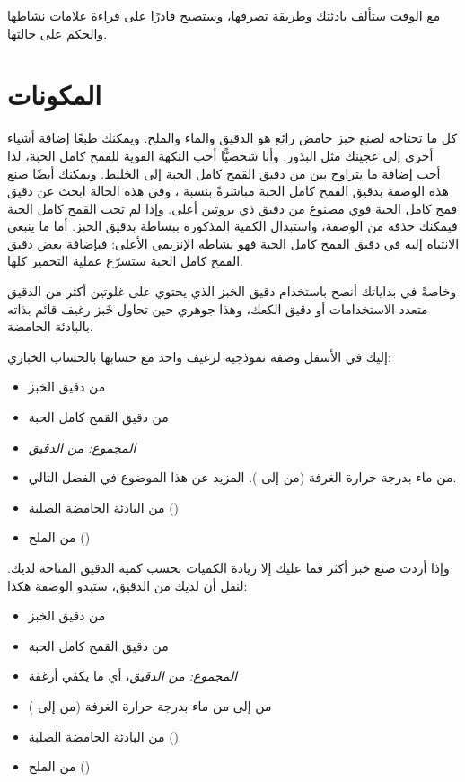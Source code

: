 مع الوقت ستألف بادئتك وطريقة تصرفها، وستصبح قادرًا على قراءة علامات نشاطها والحكم على حالتها.

\section{المكونات}

كل ما تحتاجه لصنع خبز حامض رائع هو الدقيق والماء والملح. ويمكنك طبعًا إضافة أشياء أخرى إلى عجينك مثل البذور. وأنا شخصيًّا أحب النكهة القوية للقمح كامل الحبة، لذا أحب إضافة ما يتراوح بين  من دقيق القمح كامل الحبة إلى الخليط. ويمكنك أيضًا صنع هذه الوصفة بدقيق القمح كامل الحبة مباشرةً بنسبة ، وفي هذه الحالة ابحث عن دقيق قمح كامل الحبة قوي مصنوع من دقيق ذي بروتين أعلى. وإذا لم تحب القمح كامل الحبة فيمكنك حذفه من الوصفة، واستبدال الكمية المذكورة ببساطة بدقيق الخبز. أما ما ينبغي الانتباه إليه في دقيق القمح كامل الحبة فهو نشاطه الإنزيمي الأعلى: فبإضافة بعض دقيق القمح كامل الحبة ستسرّع عملية التخمير كلها.

وخاصةً في بداياتك أنصح باستخدام دقيق الخبز الذي يحتوي على غلوتين أكثر من الدقيق متعدد الاستخدامات أو دقيق الكعك، وهذا جوهري حين تحاول خَبز رغيف قائم بذاته بالبادئة الحامضة.

إليك في الأسفل وصفة نموذجية لرغيف واحد مع حسابها بالحساب الخبازي:

\begin{itemize}
  \item {} من دقيق الخبز
  \item {} من دقيق القمح كامل الحبة
  \item \emph{المجموع:  من الدقيق}
  \item {} من ماء بدرجة حرارة الغرفة (من  إلى ). المزيد عن هذا الموضوع في الفصل التالي.
  \item {} من البادئة الحامضة الصلبة ()
  \item {} من الملح ()
\end{itemize}

وإذا أردت صنع خبز أكثر فما عليك إلا زيادة الكميات بحسب كمية الدقيق المتاحة لديك. لنقل أن لديك  من الدقيق، ستبدو الوصفة هكذا:

\begin{itemize}
  \item {} من دقيق الخبز
  \item {} من دقيق القمح كامل الحبة
  \item \emph{المجموع:  من الدقيق}، أي ما يكفي  أرغفة
  \item من  إلى  من ماء بدرجة حرارة الغرفة (من  إلى )
  \item {} من البادئة الحامضة الصلبة ()
  \item {} من الملح ()
\end{itemize}

